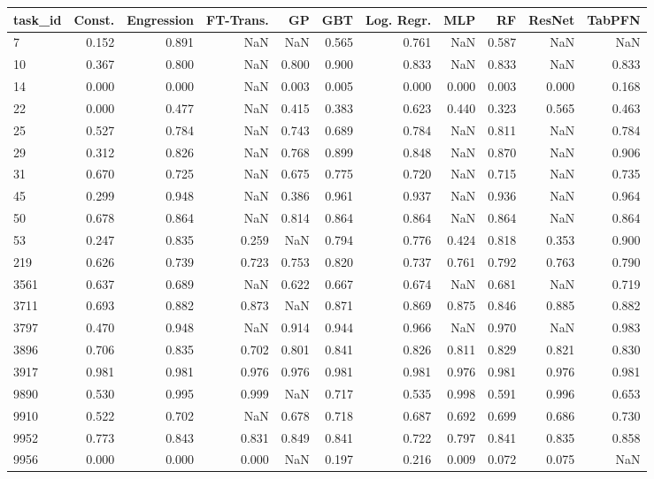 \begin{tabular}{lrrrrrrrrrr}
\toprule
task\_id & Const. & Engression & FT-Trans. & GP & GBT & Log. Regr. & MLP & RF & ResNet & TabPFN \\
\midrule
7 & 0.152 & 0.891 & NaN & NaN & 0.565 & 0.761 & NaN & 0.587 & NaN & NaN \\
10 & 0.367 & 0.800 & NaN & 0.800 & 0.900 & 0.833 & NaN & 0.833 & NaN & 0.833 \\
14 & 0.000 & 0.000 & NaN & 0.003 & 0.005 & 0.000 & 0.000 & 0.003 & 0.000 & 0.168 \\
22 & 0.000 & 0.477 & NaN & 0.415 & 0.383 & 0.623 & 0.440 & 0.323 & 0.565 & 0.463 \\
25 & 0.527 & 0.784 & NaN & 0.743 & 0.689 & 0.784 & NaN & 0.811 & NaN & 0.784 \\
29 & 0.312 & 0.826 & NaN & 0.768 & 0.899 & 0.848 & NaN & 0.870 & NaN & 0.906 \\
31 & 0.670 & 0.725 & NaN & 0.675 & 0.775 & 0.720 & NaN & 0.715 & NaN & 0.735 \\
45 & 0.299 & 0.948 & NaN & 0.386 & 0.961 & 0.937 & NaN & 0.936 & NaN & 0.964 \\
50 & 0.678 & 0.864 & NaN & 0.814 & 0.864 & 0.864 & NaN & 0.864 & NaN & 0.864 \\
53 & 0.247 & 0.835 & 0.259 & NaN & 0.794 & 0.776 & 0.424 & 0.818 & 0.353 & 0.900 \\
219 & 0.626 & 0.739 & 0.723 & 0.753 & 0.820 & 0.737 & 0.761 & 0.792 & 0.763 & 0.790 \\
3561 & 0.637 & 0.689 & NaN & 0.622 & 0.667 & 0.674 & NaN & 0.681 & NaN & 0.719 \\
3711 & 0.693 & 0.882 & 0.873 & NaN & 0.871 & 0.869 & 0.875 & 0.846 & 0.885 & 0.882 \\
3797 & 0.470 & 0.948 & NaN & 0.914 & 0.944 & 0.966 & NaN & 0.970 & NaN & 0.983 \\
3896 & 0.706 & 0.835 & 0.702 & 0.801 & 0.841 & 0.826 & 0.811 & 0.829 & 0.821 & 0.830 \\
3917 & 0.981 & 0.981 & 0.976 & 0.976 & 0.981 & 0.981 & 0.976 & 0.981 & 0.976 & 0.981 \\
9890 & 0.530 & 0.995 & 0.999 & NaN & 0.717 & 0.535 & 0.998 & 0.591 & 0.996 & 0.653 \\
9910 & 0.522 & 0.702 & NaN & 0.678 & 0.718 & 0.687 & 0.692 & 0.699 & 0.686 & 0.730 \\
9952 & 0.773 & 0.843 & 0.831 & 0.849 & 0.841 & 0.722 & 0.797 & 0.841 & 0.835 & 0.858 \\
9956 & 0.000 & 0.000 & 0.000 & NaN & 0.197 & 0.216 & 0.009 & 0.072 & 0.075 & NaN \\

\end{tabular}

